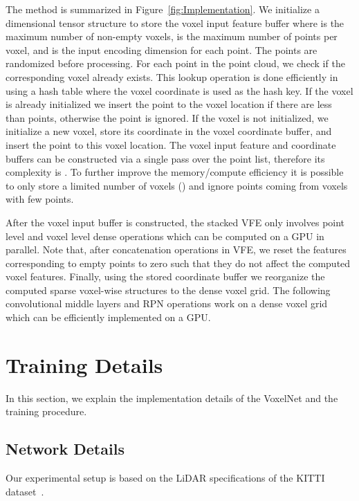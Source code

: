 \documentclass[10pt,twocolumn,letterpaper]{article}
\begin{document}
The method is summarized in Figure~\ref{fig:Implementation}. We initialize a  dimensional tensor structure to store the voxel input feature buffer where  is the maximum number of non-empty voxels,  is the maximum number of points per voxel, and  is the input encoding dimension for each point. The points are randomized before processing. For each point in the point cloud, we check if the corresponding voxel already exists. This lookup operation is done efficiently in  using a hash table where the voxel coordinate is used as the hash key. If the voxel is already initialized we insert the point to the voxel location if there are less than  points, otherwise the point is ignored. If the voxel is not initialized, we initialize a new voxel, store its coordinate in the voxel coordinate buffer, and insert the point to this voxel location. The voxel input feature and coordinate buffers can be constructed via a single pass over the point list, therefore its complexity is .  To further improve the memory/compute efficiency it is possible to only store a limited number of voxels () and ignore points coming from voxels with few points. 


After the voxel input buffer is constructed, the stacked VFE only involves point level and voxel level dense operations which can be computed on a GPU in parallel. Note that,  after concatenation operations in VFE, we reset the features corresponding to empty points to zero such that they do not affect  the computed voxel features. Finally, using the stored coordinate buffer we reorganize the computed sparse voxel-wise structures to the dense voxel grid. The following  convolutional middle layers and RPN operations work on a dense voxel grid which can be efficiently implemented on a GPU.













 
\section{Training Details}
\label{sec:training_details}
In this section, we explain the implementation details of the VoxelNet and the training procedure. 
\subsection{Network Details} 
Our experimental setup is based on the LiDAR specifications of the KITTI dataset~\cite{REF:Geiger2012CVPR}.
\end{document}
